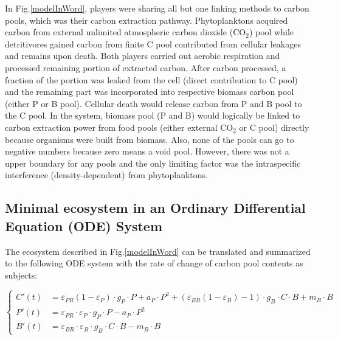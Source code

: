 \documentclass[../thesis.tex]{subfiles} %
\newcommand{\gP}{g_P}
\newcommand{\eP}{\varepsilon_P}
\newcommand{\aP}{a_P}
\newcommand{\ePR}{\varepsilon_{PR}}
\newcommand{\gB}{g_B}
\newcommand{\eB}{\varepsilon_B}
\newcommand{\mB}{m_B}
\newcommand{\eBR}{\varepsilon_{BR}}
\begin{document}
In Fig.\ref{modelInWord}, players were sharing all but one linking methods to carbon pools, which was their carbon extraction pathway.  Phytoplanktons acquired carbon from external unlimited atmospheric carbon dioxide (CO$_2$) pool while detritivores gained carbon from finite C pool contributed from cellular leakages and remains upon death.  Both players carried out aerobic respiration and processed remaining portion of extracted carbon.  After carbon processed, a fraction of the portion was leaked from the cell (direct contribution to C pool) and the remaining part was incorporated into respective biomass carbon pool (either P or B pool).  Cellular death would release carbon from P and B pool to the C pool.  In the system, biomass pool (P and B) would logically be linked to carbon extraction power from food pools (either external CO$_2$ or C pool) directly because organisms were built from biomass.  Also, none of the pools can go to negative numbers because zero means a void pool.  However, there was not a upper boundary for any pools and the only limiting factor was the intraspecific interference (density-dependent) from phytoplanktons.

\subsection{Minimal ecosystem in an Ordinary Differential Equation (ODE) System}
The ecosystem described in Fig.\ref{modelInWord} can be translated and summarized to the following ODE system with the rate of change of carbon pool contents as subjects:

\begin{equation*}\left\{\begin{array}{rl}
    C'(t) &= \ePR(1-\eP)\cdot\gP\cdot P +\aP\cdot P^2 +(\eBR(1-\eB)-1)\cdot\gB\cdot C\cdot B +\mB\cdot B\\
    P'(t) &= \ePR\cdot\eP\cdot\gP\cdot P -\aP\cdot P^2\\
    B'(t) &= \eBR\cdot\eB\cdot\gB\cdot C\cdot B -\mB\cdot B
\end{array}\right.\end{equation*}
\end{document}
